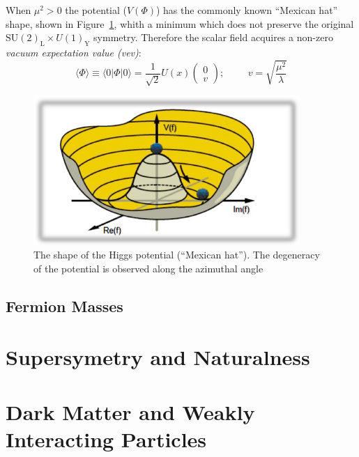 When $\mu^{2} > 0$ the potential ($V(\Phi)$) has the commonly known
``Mexican hat'' shape, shown in Figure~\ref{fig:MexHat}, whith a minimum which does not preserve the
original $\mathrm{SU(2)_{L}}\times U(1)_{\mathrm{Y}}$
symmetry. Therefore the scalar field acquires a non-zero
\textit{vacuum expectation value (vev)}:
\begin{equation}
\label{eq:vev}
\langle \Phi \rangle \equiv \langle 0 | \Phi | 0\rangle = \frac{1}{\sqrt{2}}U(x) \begin{pmatrix} 0\\
  v\end{pmatrix}; \hspace{1cm}v = \sqrt{\frac{\mu^{2}}{\lambda}}
\end{equation}

\begin{figure}
 \centering
\includegraphics[width=0.9\textwidth]{IntroFigures/MexicanHat.png}
 \caption{The shape of the Higgs potential (``Mexican hat''). The
   degeneracy of the potential is observed along the azimuthal angle\label{fig:MexHat}}
\end{figure}
\section{Fermion Masses}\label{yukawa}
\chapter{Supersymetry and Naturalness}
\chapter{Dark Matter and Weakly Interacting Particles}


